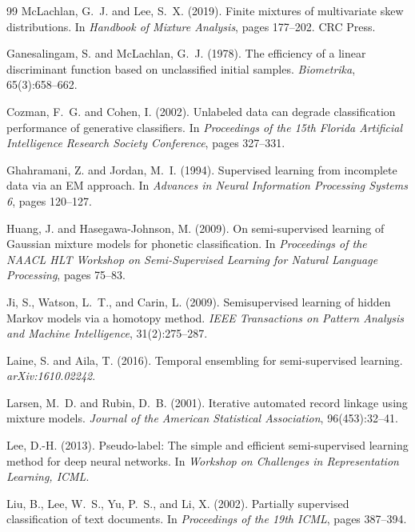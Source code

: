\documentclass[11pt]{article}
\theoremstyle{definition}
\begin{document}
\begin{thebibliography}{99}
McLachlan, G.~J. and Lee, S.~X. (2019).
Finite mixtures of multivariate skew distributions.
In \textit{Handbook of Mixture Analysis}, pages 177--202.
CRC Press.

Ganesalingam, S. and McLachlan, G.~J. (1978).
The efficiency of a linear discriminant function based on unclassified initial samples.
\textit{Biometrika}, 65(3):658--662.

Cozman, F.~G. and Cohen, I. (2002).
Unlabeled data can degrade classification performance of generative classifiers.
In \textit{Proceedings of the 15th Florida Artificial Intelligence Research Society Conference},
pages 327--331.

Ghahramani, Z. and Jordan, M.~I. (1994).
Supervised learning from incomplete data via an EM approach.
In \textit{Advances in Neural Information Processing Systems 6}, pages 120--127.

Huang, J. and Hasegawa-Johnson, M. (2009).
On semi-supervised learning of Gaussian mixture models for phonetic classification.
In \textit{Proceedings of the NAACL HLT Workshop on Semi-Supervised Learning
for Natural Language Processing}, pages 75--83.

Ji, S., Watson, L.~T., and Carin, L. (2009).
Semisupervised learning of hidden Markov models via a homotopy method.
\textit{IEEE Transactions on Pattern Analysis and Machine Intelligence},
31(2):275--287.

Laine, S. and Aila, T. (2016).
Temporal ensembling for semi-supervised learning.
\textit{arXiv:1610.02242}.

Larsen, M.~D. and Rubin, D.~B. (2001).
Iterative automated record linkage using mixture models.
\textit{Journal of the American Statistical Association}, 96(453):32--41.

Lee, D.-H. (2013).
Pseudo-label: The simple and efficient semi-supervised learning method
for deep neural networks.
In \textit{Workshop on Challenges in Representation Learning, ICML}.

Liu, B., Lee, W.~S., Yu, P.~S., and Li, X. (2002).
Partially supervised classification of text documents.
In \textit{Proceedings of the 19th ICML}, pages 387--394.


\end{thebibliography}
\end{document}
